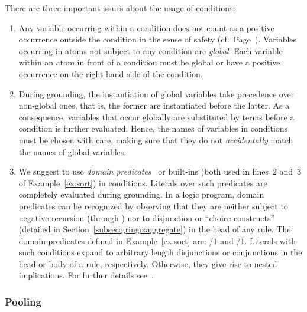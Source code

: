 \begin{Note}
There are three important issues about the usage of conditions:
\begin{enumerate}
%
\item 
Any variable occurring within a condition 
does not count as a positive occurrence outside the condition
in the sense of safety (cf.\ Page~\pageref{pg:safe}).
Variables occurring in atoms not subject to any condition are \emph{global}. 
Each variable within an atom in front of a condition 
must be global or have a positive occurrence on the right-hand side of
the condition.
%
\item
During grounding,
the instantiation of global variables take precedence over non-global ones,
that is, the former are instantiated before the latter.
As a consequence, variables that occur globally are substituted by terms
before a condition is further evaluated.
Hence, the names of variables in conditions must be chosen with care,
making sure that they do not \emph{accidentally} match the names of global variables.
%
\item 
We suggest to use \emph{domain predicates}~\cite{lparseManual}
or built-ins (both used in lines~2 and~3  of Example~\ref{ex:sort})
in conditions.
%
%
\label{pg:domain}%
Literals over such predicates are completely evaluated during grounding.
In a logic program, domain predicates can be recognized by observing
that they are neither subject to negative recursion (through )
nor to disjunction or ``choice constructs'' (detailed in Section~\ref{subsec:gringo:aggregate})
in the head of any rule.
The domain predicates defined in Example~\ref{ex:sort} are:
/$1$ and /$1$.
Literals with such conditions expand to arbitrary length disjunctions or conjunctions in the head or body of a rule, respectively.
Otherwise, they give rise to nested implications.
For further details see~\cite{haliya14a}.
\end{enumerate}
\end{Note}

\subsubsection{Pooling}\label{subsec:gringo:pool}

